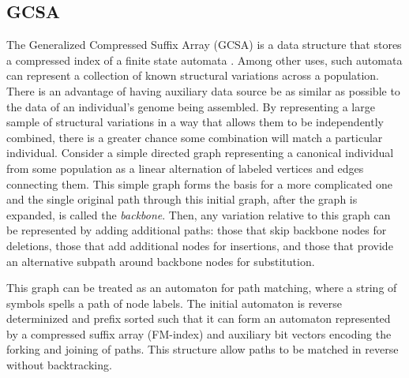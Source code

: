\documentclass[doctor]{thesis}
\begin{document}

\subsection{GCSA}

The Generalized Compressed Suffix Array (GCSA) is a data structure that stores a compressed index of a finite state automata \cite{siren2014indexing}.
Among other uses, such automata can represent a collection of known structural variations across a population.
There is an advantage of having auxiliary data source be as similar as possible to the data of an individual's genome being assembled.  By representing a large sample of structural variations in a way that allows them to be independently combined, there is a greater chance some combination will match a particular individual.
Consider a simple directed graph representing a canonical individual from some population as a linear alternation of labeled vertices and edges connecting them.
This simple graph forms the basis for a more complicated one and the single original path through this initial graph, after the graph is expanded, is called the \emph{backbone}.
Then, any variation relative to this graph can be represented by adding additional paths: those that skip backbone nodes for deletions, those that add additional nodes for insertions, and those that provide an alternative subpath around backbone nodes for substitution.  

This graph can be treated as an automaton for path matching, where a string of symbols spells a path of node labels.
The initial automaton is reverse determinized and prefix sorted such that it can form an automaton represented by a compressed suffix array (FM-index) and auxiliary bit vectors encoding the forking and joining of paths.  This structure allow paths to be matched in reverse without backtracking.
\end{document}

